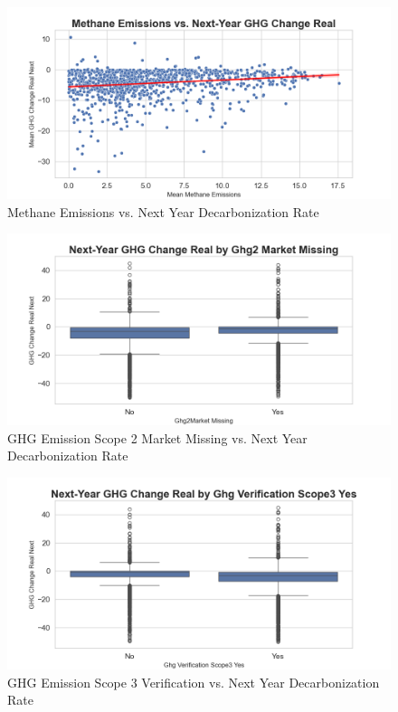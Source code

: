 \begin{figure}[H]
\centering
  \includegraphics[width=\textwidth]{figures/methane_emissions_vs_ghg_change_real_next.png}
\caption{Methane Emissions vs. Next Year Decarbonization Rate}
\label{fig:methane_emissions_vs_ghg_change_real_next}
\end{figure}

\begin{figure}[H]
\centering
  \includegraphics[width=\textwidth]{figures/ghg_change_real_next_by_ghg2market_na.png}
\caption{GHG Emission Scope 2 Market Missing vs. Next Year Decarbonization Rate}
\label{fig:ghg_change_real_next_by_ghg2market_na}
\end{figure}

\begin{figure}[H]
\centering
  \includegraphics[width=\textwidth]{figures/ghg_change_real_next_by_ghg_verification_scope3_yes.png}
\caption{GHG Emission Scope 3 Verification vs. Next Year Decarbonization Rate}
\label{fig:ghg_change_real_next_by_ghg_verification_scope3_yes}
\end{figure}


